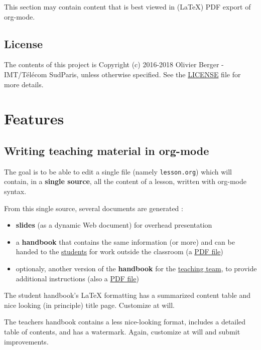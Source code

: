 \documentclass[a4paper]{article}
\newenvironment{NOTES}{\begin{lrbox}{\mybox}\begin{minipage}{0.9\textwidth}\begin{shaded}}{\end{shaded}\end{minipage}\end{lrbox}\fbox{\usebox{\mybox}}}
\begin{document}
This section may contain content that is best viewed in (\LaTeX{}) PDF export of org-mode.

\subsection{License}
\label{sec:orgc94ee75}

The contents of this project is Copyright (c) 2016-2018 Olivier
Berger - IMT/Télécom SudParis, unless otherwise specified. See the
\url{LICENSE} file for more details.

\section{Features}
\label{sec:org20a9a10}
\subsection{Writing teaching material in org-mode}
\label{sec:org25c84ca}

The goal is to be able to edit a single file (namely \texttt{lesson.org})
which will contain, in a \textbf{single source}, all the content of a lesson,
written with org-mode syntax.

From this single source, several documents are generated :
\begin{itemize}
\item \textbf{slides} (as a dynamic Web document) for overhead presentation
\item a \textbf{handbook} that contains the same information (or more) and can be
handed to the \uline{students} for work outside the classroom (a \href{handbook.pdf}{PDF file})
\end{itemize}

\begin{itemize}
\item optionaly, another version of the \textbf{handbook} for the \uline{teaching team}, to provide additional instructions (also a \href{teacher-handbook.pdf}{PDF file})
\end{itemize}

\begin{NOTES}
The student handbook's \LaTeX{} formatting has a summarized content table and nice looking (in principle) title page. Customize at will.

The teachers handbook contains a less nice-looking format, includes a detailed table of contents, and has a watermark. Again, customize at will and submit improvements.
\end{NOTES}
\end{document}
